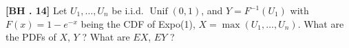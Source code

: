 
\begin{exercise}
	\textbf{[BH . 14]}  Let $U_1, \ldots, U_n$ be i.i.d. $\operatorname{Unif}(0,1)$, and $Y=F^{-1}(U_1)$ with $F(x)=1-e^{-x}$ being the CDF of Expo(1), $X=\max \left(U_1, \ldots, U_n\right)$. What are the PDFs of $X$, $Y$ ? What are $E X$, $E Y$ ?
\end{exercise}
